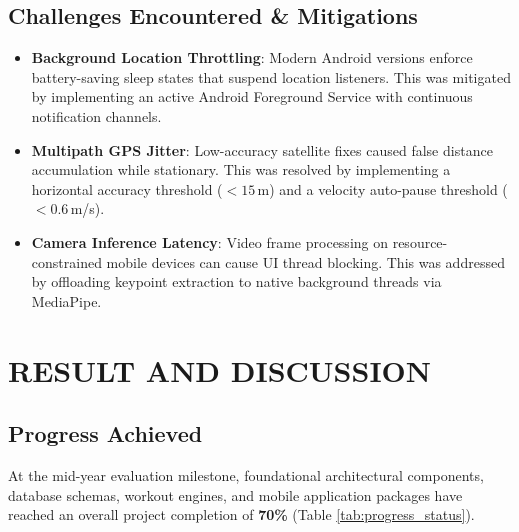 \documentclass[12pt,a4paper]{report}
\begin{document}
\section{Challenges Encountered \& Mitigations}
\begin{itemize}
    \item \textbf{Background Location Throttling}: Modern Android versions enforce battery-saving sleep states that suspend location listeners. This was mitigated by implementing an active Android Foreground Service with continuous notification channels.
    \item \textbf{Multipath GPS Jitter}: Low-accuracy satellite fixes caused false distance accumulation while stationary. This was resolved by implementing a horizontal accuracy threshold ($<15$\,m) and a velocity auto-pause threshold ($<0.6$\,m/s).
    \item \textbf{Camera Inference Latency}: Video frame processing on resource-constrained mobile devices can cause UI thread blocking. This was addressed by offloading keypoint extraction to native background threads via MediaPipe.
\end{itemize}

\chapter{RESULT AND DISCUSSION}

\section{Progress Achieved}
At the mid-year evaluation milestone, foundational architectural components, database schemas, workout engines, and mobile application packages have reached an overall project completion of \textbf{70\%} (Table \ref{tab:progress_status}).
\end{document}
